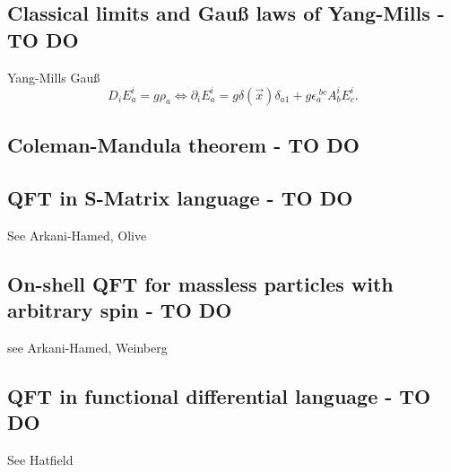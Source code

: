 \subsection{Classical limits and Gauß laws of Yang-Mills - TO DO}
\begin{mybox}{}
	Yang-Mills Gauß
	\begin{equation}
	D_i E^i_a = g \rho_a \Leftrightarrow \partial_i E^i_a = g \delta(\vec{x}) \delta_{a 1} + g \epsilon^{\;bc}_a A^i_b E^i_c.
	\end{equation}
\end{mybox}

\subsection{Coleman-Mandula theorem - TO DO}
\subsection{QFT in S-Matrix language - TO DO}
See Arkani-Hamed, Olive
\subsection{On-shell QFT for massless particles with arbitrary spin - TO DO}
see Arkani-Hamed, Weinberg
\subsection{QFT in functional differential language - TO DO}
See Hatfield
\newpage
























